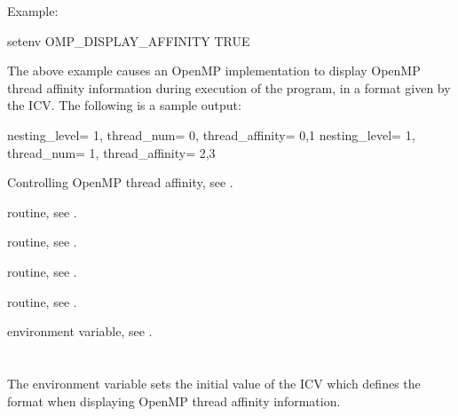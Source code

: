 Example:
\begin{ompEnv}
setenv OMP_DISPLAY_AFFINITY TRUE
\end{ompEnv}

The above example causes an OpenMP implementation to display OpenMP thread
affinity information during execution of the program, in a format given by
the  ICV.  The following is a sample output:

\begin{ompSyntax}
nesting_level=   1,   thread_num=   0,   thread_affinity=    0,1
nesting_level=   1,   thread_num=   1,   thread_affinity=    2,3
\end{ompSyntax}

\begin{crossrefs}
\item Controlling OpenMP thread affinity,
see .

\item {} routine,
see .

\item {} routine,
see .

\item {} routine,
see .

\item {} routine,
see .

\item {} environment variable,
see .
\end{crossrefs}



\section{}
\label{sec:OMP_AFFINITY_FORMAT}

The  environment variable sets the initial value of the
 ICV which defines the format when displaying OpenMP
thread affinity information.

